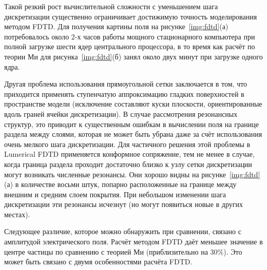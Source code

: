 Такой резкий рост вычислительной сложности с уменьшением шага
дискретизации существенно ограничивает достижимую точность
моделирования методом FDTD. Для получения картины поля на
рисунке~\ref{img:fdtd}(а) потребовалось около 2-х часов работы мощного
стационарного компьютера при полной загрузке шести ядер центрального
процессора, в то время как расчёт по теории Ми для
рисунка~\ref{img:fdtd}(б) занял около двух минут при загрузке одного
ядра.

Другая проблема использования прямоугольной сетки заключается в том,
что приходится применять ступенчатую аппроксимацию гладких
поверхностей в пространстве модели (исключение составляют куски
плоскости, ориентированные вдоль граней ячейки дискретизации). В
случае рассмотрения резонансных структур, это приводит к существенным
ошибкам в вычислении поля на границе раздела между слоями, которая не
может быть убрана даже за счёт использования очень мелкого шага
дискретизации.  Для частичного решения этой проблемы в Lumerical FDTD
применяется конформное сопряжение, тем не менее в случае, когда
граница раздела проходит достаточно близко к узлу сетки дискретизации
могут возникать численные резонансы. Они хорошо видны на
рисунке~\ref{img:fdtd}(а) в количестве восьми штук, попарно
расположенные на границе между внешним и средним слоем покрытия. При
небольшом изменении шага дискретизации эти резонансы исчезнут (но
могут появиться новые в других местах).

Следующее различие, которое можно обнаружить при сравнении, связано с
амплитудой электрического поля.  Расчёт методом FDTD даёт меньшее
значение в центре частицы по сравнению с теорией Ми (приблизительно на
30\%).  Это может быть связано с двумя особенностями расчёта FDTD.

